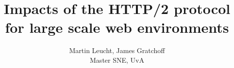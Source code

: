 \documentclass{article}
\begin{document}
 
\begin{figure}[!bh]
 	\begin{center}
		\huge \title{Impacts of the HTTP/2 protocol for large scale web environments}
		\author{Martin Leucht, James Gratchoff \\
		Master SNE, UvA} 
	\maketitle 
		\label{sec:uva}
	\end{center}
\end{figure}
\setlength{\columnsep}{2cm}
\def\columnseprulecolor{\color{blue}}
 
\newpage










\end{document}
